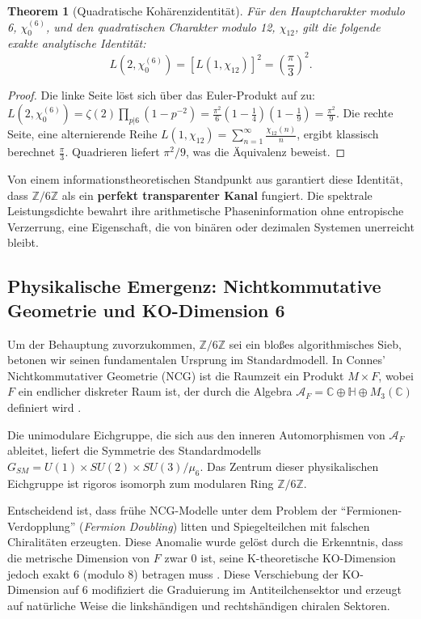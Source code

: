 \documentclass[aps,prl,preprint,superscriptaddress,floatfix]{revtex4-2}
\newtheorem{theorem}{Theorem}[section]
\newcommand{\Zmod}{\mathbb{Z}/6\mathbb{Z}}
\begin{document}
\begin{theorem}[Quadratische Kohärenzidentität]
\label{thm:quadratic}
Für den Hauptcharakter modulo 6, $\chi_0^{(6)}$, und den quadratischen Charakter modulo 12, $\chi_{12}$, gilt die folgende exakte analytische Identität:
\begin{equation}
L(2, \chi_0^{(6)}) = \left[ L(1, \chi_{12}) \right]^2 = \left( \frac{\pi}{3} \right)^2.
\end{equation}
\end{theorem}

\begin{proof}
Die linke Seite löst sich über das Euler-Produkt auf zu:
$L(2, \chi_0^{(6)}) = \zeta(2) \prod_{p|6} (1-p^{-2}) = \frac{\pi^2}{6} \left(1-\frac{1}{4}\right)\left(1-\frac{1}{9}\right) = \frac{\pi^2}{9}$.
Die rechte Seite, eine alternierende Reihe $L(1, \chi_{12}) = \sum_{n=1}^\infty \frac{\chi_{12}(n)}{n}$, ergibt klassisch berechnet $\frac{\pi}{3}$. Quadrieren liefert $\pi^2/9$, was die Äquivalenz beweist.
\end{proof}

Von einem informationstheoretischen Standpunkt aus garantiert diese Identität, dass $\Zmod$ als ein \textbf{perfekt transparenter Kanal} fungiert. Die spektrale Leistungsdichte bewahrt ihre arithmetische Phaseninformation ohne entropische Verzerrung, eine Eigenschaft, die von binären oder dezimalen Systemen unerreicht bleibt.

\subsection{Physikalische Emergenz: Nichtkommutative Geometrie und KO-Dimension 6}

Um der Behauptung zuvorzukommen, $\Zmod$ sei ein bloßes algorithmisches Sieb, betonen wir seinen fundamentalen Ursprung im Standardmodell. In Connes' Nichtkommutativer Geometrie (NCG) ist die Raumzeit ein Produkt $M \times F$, wobei $F$ ein endlicher diskreter Raum ist, der durch die Algebra $\mathcal{A}_F = \mathbb{C} \oplus \mathbb{H} \oplus M_3(\mathbb{C})$ definiert wird \cite{Connes2008}.

Die unimodulare Eichgruppe, die sich aus den inneren Automorphismen von $\mathcal{A}_F$ ableitet, liefert die Symmetrie des Standardmodells $G_{SM} = U(1) \times SU(2) \times SU(3) / \mu_6$. Das Zentrum dieser physikalischen Eichgruppe ist rigoros isomorph zum modularen Ring $\mathbb{Z}/6\mathbb{Z}$. 

Entscheidend ist, dass frühe NCG-Modelle unter dem Problem der \enquote{Fermionen-Verdopplung} (\textit{Fermion Doubling}) litten und Spiegelteilchen mit falschen Chiralitäten erzeugten. Diese Anomalie wurde gelöst durch die Erkenntnis, dass die metrische Dimension von $F$ zwar 0 ist, seine K-theoretische KO-Dimension jedoch exakt 6 (modulo 8) betragen muss \cite{Chamseddine2007}. Diese Verschiebung der KO-Dimension auf 6 modifiziert die Graduierung im Antiteilchensektor und erzeugt auf natürliche Weise die linkshändigen und rechtshändigen chiralen Sektoren.
\end{document}
